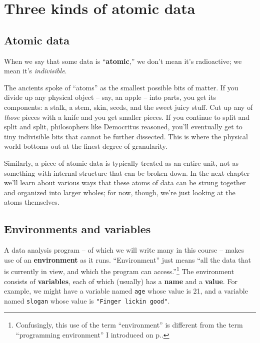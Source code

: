 
%

\chapter{Three kinds of atomic data}
\label{ch:atomicData}

\section{Atomic data}

When we say that some data is ``\textbf{atomic},'' we don't mean it's
radioactive; we mean it's \textit{indivisible}.

The ancients spoke of ``atoms'' as the smallest possible bits of matter. If you
divide up any physical object -- say, an apple -- into parts, you get its
components: a stalk, a stem, skin, seeds, and the sweet juicy stuff. Cut up any
of \textit{those} pieces with a knife and you get smaller pieces. If you
continue to split and split and split, philosophers like Democritus reasoned,
you'll eventually get to tiny indivisible bits that cannot be further
dissected. This is where the physical world bottoms out at the finest degree of
granularity.

Similarly, a piece of atomic data is typically treated as an entire unit, not
as something with internal structure that can be broken down. In the next
chapter we'll learn about various ways that these atoms of data can be strung
together and organized into larger wholes; for now, though, we're just looking
at the atoms themselves.

\section{Environments and variables}

A data analysis program -- of which we will write many in this course -- makes
use of an \textbf{environment} as it runs. ``Environment'' just means ``all the
data that is currently in view, and which the program can
access.''\footnote{Confusingly, this use of the term ``environment'' is
different from the term ``programming environment'' I introduced on
p.\pageref{programmingEnvironment}.}  The environment consists of
\label{sec:envsAndVariables}
\textbf{variables}, each of which (usually) has a \textbf{name} and a
\textbf{value}. For example, we might have a variable named \texttt{age} whose
value is 21, and a variable named \texttt{slogan} whose value is
\texttt{"Finger lickin\textquotesingle{} good"}.

